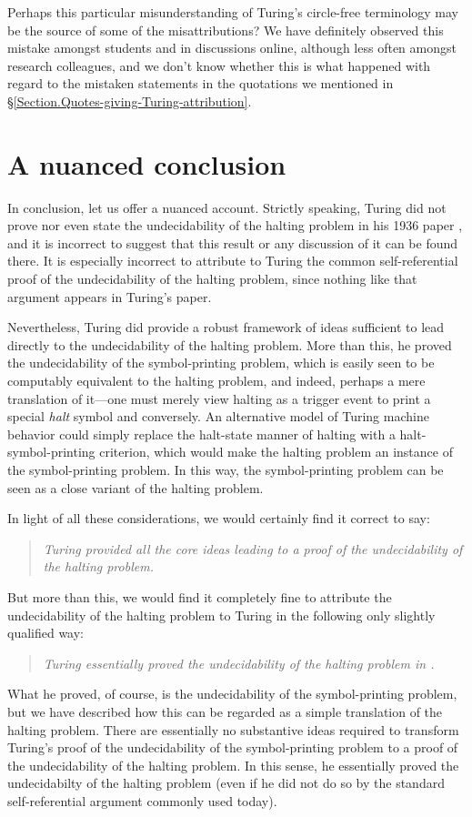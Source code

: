 \documentclass{amsart}
\begin{document}
Perhaps this particular misunderstanding of Turing's circle-free terminology may be the source of some of the misattributions? We have definitely observed this mistake amongst students and in discussions online, although less often amongst research colleagues, and we don't know whether this is what happened with regard to the mistaken statements in the quotations we mentioned in \S\ref{Section.Quotes-giving-Turing-attribution}.

\section{A nuanced conclusion}

In conclusion, let us offer a nuanced account. Strictly speaking, Turing did not prove nor even state the undecidability of the halting problem in his 1936 paper \cite{Turing1936:On-computable-numbers}, and it is incorrect to suggest that this result or any discussion of it can be found there. It is especially incorrect to attribute to Turing \cite{Turing1936:On-computable-numbers} the common self-referential proof of the undecidability of the halting problem, since nothing like that argument appears in Turing's paper. 

Nevertheless, Turing did provide a robust framework of ideas sufficient to lead directly to the undecidability of the halting problem. More than this, he proved the undecidability of the symbol-printing problem, which is easily seen to be computably equivalent to the halting problem, and indeed, perhaps a mere translation of it---one must merely view halting as a trigger event to print a special \emph{halt} symbol and conversely. An alternative model of Turing machine behavior could simply replace the halt-state manner of halting with a halt-symbol-printing criterion, which would make the halting problem an instance of the symbol-printing problem. In this way, the symbol-printing problem can be seen as a close variant of the halting problem.\goodbreak

In light of all these considerations, we would certainly find it correct to say:
\begin{quote}\it
Turing \cite{Turing1936:On-computable-numbers} provided all the core ideas leading to a proof of the undecidability of the halting problem.
\end{quote}
But more than this, we would find it completely fine to attribute the undecidability of the halting problem to Turing in the following only slightly qualified way:
\begin{quote}\it 
Turing essentially proved the undecidability of the halting problem in \cite{Turing1936:On-computable-numbers}.
\end{quote}
What he proved, of course, is the undecidability of the symbol-printing problem, but we have described how this can be regarded as a simple translation of the halting problem. There are essentially no substantive ideas required to transform Turing's proof of the undecidability of the symbol-printing problem to a proof of the undecidability of the halting problem. In this sense, he essentially proved the undecidabilty of the halting problem (even if he did not do so by the standard self-referential argument commonly used today).
\end{document}
